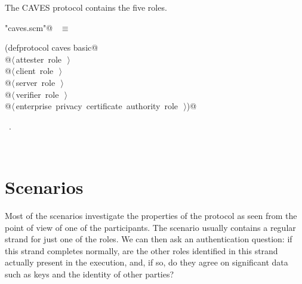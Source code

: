 \documentclass[titlepage,12pt]{article}
\theoremstyle{definition}
\begin{document}
The CAVES protocol contains the five roles.
\begin{flushleft} \small
\begin{minipage}{\linewidth} \label{scrap23}
\verb@"caves.scm"@\nobreak\ {\footnotesize {} }$\equiv$
\vspace{-1ex}
\begin{list}{}{} \item
\mbox{}\verb@(defprotocol caves basic@\\
\mbox{}\verb@  @\hbox{$\langle\,$attester role\nobreak\ {\footnotesize {}}$\,\rangle$}\verb@@\\
\mbox{}\verb@  @\hbox{$\langle\,$client role\nobreak\ {\footnotesize {}}$\,\rangle$}\verb@@\\
\mbox{}\verb@  @\hbox{$\langle\,$server role\nobreak\ {\footnotesize {}}$\,\rangle$}\verb@@\\
\mbox{}\verb@  @\hbox{$\langle\,$verifier role\nobreak\ {\footnotesize {}}$\,\rangle$}\verb@@\\
\mbox{}\verb@  @\hbox{$\langle\,$enterprise privacy certificate authority role\nobreak\ {\footnotesize {}}$\,\rangle$}\verb@)@{\NWsep}
\end{list}
\vspace{-1ex}
\footnotesize\addtolength{\baselineskip}{-1ex}
\begin{list}{}{\setlength{\itemsep}{-\parsep}\setlength{\itemindent}{-\leftmargin}}
\item \NWtxtFileDefBy\ .
\end{list}
\end{minipage}\\[4ex]
\end{flushleft}
\section{Scenarios}\label{sec:scenarios}

Most of the scenarios investigate the properties of the protocol
as seen from the point of view of one of the participants. The
scenario usually contains a regular strand for just one of the roles.
We can then ask an authentication question: if this strand
completes normally, are the other roles identified in this strand
actually present in the execution, and, if so, do they agree on
significant data such as keys and the identity of other parties?
\end{document}
